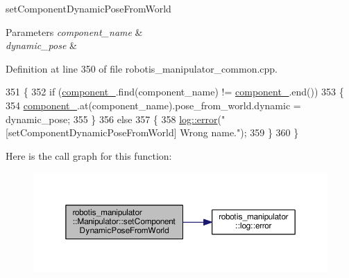set\+Component\+Dynamic\+Pose\+From\+World 


\begin{DoxyParams}{Parameters}
{\em component\+\_\+name} & \\
\hline
{\em dynamic\+\_\+pose} & \\
\hline
\end{DoxyParams}


Definition at line 350 of file robotis\+\_\+manipulator\+\_\+common.\+cpp.


\begin{DoxyCode}
351 \{
352   \textcolor{keywordflow}{if} (\hyperlink{classrobotis__manipulator_1_1_manipulator_a20b388b821f161972c2cf737fe1c26db}{component\_}.find(component\_name) != \hyperlink{classrobotis__manipulator_1_1_manipulator_a20b388b821f161972c2cf737fe1c26db}{component\_}.end())
353   \{
354     \hyperlink{classrobotis__manipulator_1_1_manipulator_a20b388b821f161972c2cf737fe1c26db}{component\_}.at(component\_name).pose\_from\_world.dynamic = dynamic\_pose;
355   \}
356   \textcolor{keywordflow}{else}
357   \{
358     \hyperlink{namespacerobotis__manipulator_1_1log_a6a84cb5481107ad244344093086fb557}{log::error}(\textcolor{stringliteral}{"[setComponentDynamicPoseFromWorld] Wrong name."});
359   \}
360 \}
\end{DoxyCode}


Here is the call graph for this function\+:\nopagebreak
\begin{figure}[H]
\begin{center}
\leavevmode
\includegraphics[width=350pt]{classrobotis__manipulator_1_1_manipulator_a904b6dccb05e5edaae2c7e29d54fd197_cgraph}
\end{center}
\end{figure}


